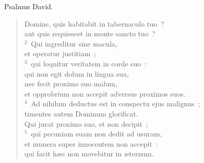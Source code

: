 \lettrine[lines=3,image=true,loversize=0.05,lraise=-0.03]{P}{}salmus David. \begin{flushleft}\begin{verse}\vspace{6pt}Domine, quis habitabit in tabernaculo tuo~?\\ aut quis requiescet in monte sancto tuo~?\\
${}^{2}$~Qui ingreditur sine macula,\\ et operatur justitiam~;\\
${}^{3}$~qui loquitur veritatem in corde suo~:\\ qui non egit dolum in lingua sua,\\ nec fecit proximo suo malum,\\ et opprobrium non accepit adversus proximos suos.\\
${}^{4}$~Ad nihilum deductus est in conspectu ejus malignus~;\\ timentes autem Dominum glorificat.\\ Qui jurat proximo suo, et non decipit~;\\
${}^{5}$~qui pecuniam suam non dedit ad usuram,\\ et munera super innocentem non accepit~:\\ qui facit h\ae c non movebitur in \ae ternum.\end{verse}\end{flushleft}



